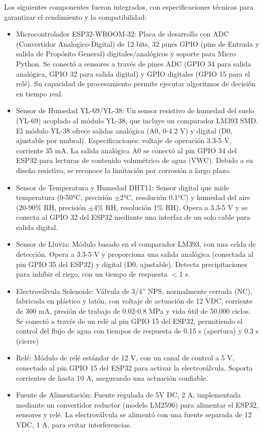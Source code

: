 \documentclass[pdflatex,sn-mathphys-num]{sn-jnl}%
\theoremstyle{thmstyleone}%
\theoremstyle{thmstyletwo}%
\theoremstyle{thmstylethree}%
\begin{document}
Los siguientes componentes fueron integrados, con especificaciones técnicas para garantizar el rendimiento y la compatibilidad:
\begin{itemize}
  \item Microcontrolador ESP32-WROOM-32: Placa de desarrollo con ADC (Convertidor Analogico-Digital) de 12 bits, 32 pines GPIO (pins de Entrada y salida de Propósito General) digitales/analógicos y soporte para Micro Python. Se conectó a sensores a través de pines ADC (GPIO 34 para salida analógica, GPIO 32 para salida digital) y GPIO digitales (GPIO 15 para el relé). Su capacidad de procesamiento permite ejecutar algoritmos de decisión en tiempo real.
  \item Sensor de Humedad YL-69/YL-38: Un sensor resistivo de humedad del suelo (YL-69) acoplado al módulo YL-38, que incluye un comparador LM393 SMD. El módulo YL-38 ofrece salidas analógica (A0, 0-4.2 V) y digital (D0, ajustable por umbral). Especificaciones: voltaje de operación 3.3-5 V, corriente 35 mA. La salida analógica A0 se conectó al pin GPIO 34 del ESP32 para lecturas de contenido volumétrico de agua (VWC). Debido a su diseño resistivo, se reconoce la limitación por corrosión a largo plazo.
  \item Sensor de Temperatura y Humedad DHT11: Sensor digital que mide temperatura (0-50°C, precisión $\pm$2°C, resolución 0.1°C) y humedad del aire (20-90\% RH, precisión $\pm$4\% RH, resolución 1\% RH). Opera a 3.3-5 V y se conecta al GPIO 32 del ESP32 mediante una interfaz de un solo cable para salida digital. 
  \item Sensor de Lluvia: Módulo basado en el comparador LM393, con una celda de detección. Opera a 3.3-5 V y proporciona una salida analógica (conectada al pin GPIO 35 del ESP32) y digital (D0, ajustable). Detecta precipitaciones para inhibir el riego, con un tiempo de respuesta $<$1 s.
  \item Electroválvula Solenoide: Válvula de 3/4'' NPS, normalmente cerrada (NC), fabricada en plástico y latón, con voltaje de actuación de 12 VDC, corriente de 300 mA, presión de trabajo de 0.02-0.8 MPa y vida útil de 50,000 ciclos. Se conectó a través de un relé al pin GPIO 15 del ESP32, permitiendo el control del flujo de agua con tiempos de respuesta de 0.15 s (apertura) y 0.3 s (cierre)
  \item Relé: Módulo de relé estándar de 12 V, con un canal de control a 5 V, conectado al pin GPIO 15 del ESP32 para activar la electroválvula. Soporta corrientes de hasta 10 A, asegurando una actuación confiable.
  \item Fuente de Alimentación: Fuente regulada de 5V DC, 2 A, implementada mediante un convertidor reductor (modelo LM2596) para alimentar el ESP32, sensores y relé. La electroválvula se alimentó con una fuente separada de 12 VDC, 1 A, para evitar interferencias.
\end{itemize}
\end{document}
